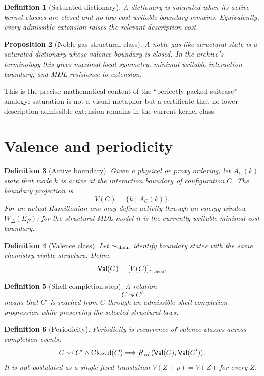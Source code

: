 \documentclass[11pt,a4paper]{article}
\newtheorem{definition}{Definition}[section]
\newtheorem{proposition}[definition]{Proposition}
\theoremstyle{remark}
\newcommand{\Val}{\mathsf{Val}}
\newcommand{\simchem}{\sim_{\rm chem}}
\begin{document}
\begin{definition}[Saturated dictionary]
A dictionary is saturated when its active kernel classes are closed and no
low-cost writable boundary remains.  Equivalently, every admissible extension
raises the relevant description cost.
\end{definition}

\begin{proposition}[Noble-gas structural class]
A noble-gas-like structural state is a saturated dictionary whose valence
boundary is closed.  In the archive's terminology this gives maximal local
symmetry, minimal writable interaction boundary, and MDL resistance to
extension.
\end{proposition}

This is the precise mathematical content of the ``perfectly packed suitcase''
analogy: saturation is not a visual metaphor but a certificate that no
lower-description admissible extension remains in the current kernel class.

\section{Valence and periodicity}

\begin{definition}[Active boundary]
Given a physical or proxy ordering, let $A_C(k)$ state that mode $k$ is active
at the interaction boundary of configuration $C$.  The boundary projection is
\[
 V(C)=\{k\mid A_C(k)\}.
\]
For an actual Hamiltonian one may define activity through an energy window
$W_{\Delta}(E_F)$; for the structural MDL model it is the currently writable
minimal-cost boundary.
\end{definition}

\begin{definition}[Valence class]
Let $\simchem$ identify boundary states with the same chemistry-visible
structure.  Define
\[
 \Val(C)=[V(C)]_{\simchem}.
\]
\end{definition}

\begin{definition}[Shell-completion step]
A relation
\[
 C\leadsto C'
\]
means that $C'$ is reached from $C$ through an admissible shell-completion
progression while preserving the selected structural laws.
\end{definition}

\begin{definition}[Periodicity]
Periodicity is recurrence of valence classes across completion events:
\[
 C\leadsto C'\land\operatorname{Closed}(C)
 \Longrightarrow
 R_{\rm val}(\Val(C),\Val(C')).
\]
It is not postulated as a single fixed translation $V(Z+p)=V(Z)$ for every
$Z$.
\end{definition}
\end{document}
